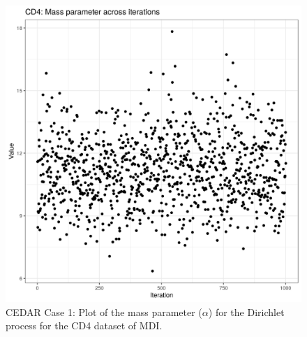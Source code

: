 \documentclass[12pt]{article} %
\begin{document}
	\begin{figure}[h]
		\centering
		\includegraphics[scale=0.75]{Images/Biology_data/Set_250/All_datasets/Mass_parameter_plots/CD4.png}
		\caption{CEDAR Case 1: Plot of the mass parameter ($\alpha$) for the Dirichlet process for the CD4 dataset of MDI.}
		\label{fig:results:cedar_1:mdi_cd4_mass_parameter_plot}
	\end{figure}
	
	\newpage
	
\end{document}

